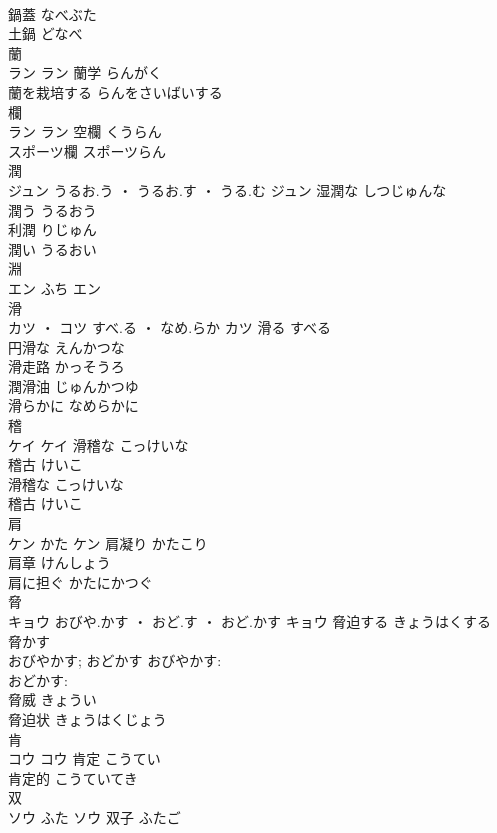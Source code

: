 \documentclass[8pt]{extreport}
\begin{document}
\begin{CJK}{UTF8}{min}
\\	鍋蓋	なべぶた	
\\	土鍋	どなべ	
\\	蘭	
\\	ラン		ラン	蘭学	らんがく	
\\	蘭を栽培する	らんをさいばいする	
\\	欄	
\\	ラン		ラン	空欄	くうらん	
\\	スポーツ欄	スポーツらん	
\\	潤	
\\	ジュン	うるお.う ・ うるお.す ・ うる.む	ジュン	湿潤な	しつじゅんな	
\\	潤う	うるおう	
\\	利潤	りじゅん	
\\	潤い	うるおい	
\\	淵	
\\	エン	ふち	エン																																			
\\	滑	
\\	カツ ・ コツ	すべ.る ・ なめ.らか	カツ	滑る	すべる	
\\	円滑な	えんかつな	
\\	滑走路	かっそうろ	
\\	潤滑油	じゅんかつゆ	
\\	滑らかに	なめらかに	
\\	稽	
\\	ケイ		ケイ	滑稽な	こっけいな	
\\	稽古	けいこ	
\\	滑稽な	こっけいな	
\\	稽古	けいこ	
\\	肩	
\\	ケン	かた	ケン	肩凝り	かたこり	
\\	肩章	けんしょう	
\\	肩に担ぐ	かたにかつぐ	
\\	脅	
\\	キョウ	おびや.かす ・ おど.す ・ おど.かす	キョウ	脅迫する	きょうはくする	
\\	脅かす 
\\	おびやかす; おどかす	おびやかす: 
\\	おどかす: 
\\	脅威	きょうい	
\\	脅迫状	きょうはくじょう	
\\	肯	
\\	コウ		コウ	肯定	こうてい	
\\	肯定的	こうていてき	
\\	双	
\\	ソウ	ふた	ソウ	双子	ふたご	

\end{CJK}
\end{document}
